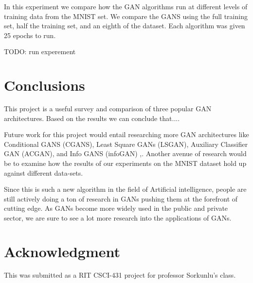 \documentclass[12pt,
 reprint,
 amsmath,amssymb,
 aps,
]{revtex4-2}
\begin{document}
In this experiment we compare how the GAN algorithms run at different levels of training data from the MNIST set. We compare the GANS using the full training set, half the training set, and an eighth of the dataset. Each algorithm was given 25 epochs to run. 

TODO: run experement






\section{\label{sec:exp}Conclusions}

This project is a useful survey and comparison of three popular GAN architectures. Based on the results we can conclude that....

Future work for this project would entail researching more GAN architectures like Conditional GANS (CGANS), Least Square GANs (LSGAN), Auxiliary Classifier GAN (ACGAN), and Info GANS (infoGAN) \cite{cGAN, lsgan, acgan, infogan},. Another avenue of research would be to examine how the results of our experiments on the MNIST dataset hold up against different data-sets. 

Since this is such a new algorithm in the field of Artificial intelligence, people are still actively doing a ton of research in GANs pushing them at the forefront of cutting edge. As GANs become more widely used in the public and private sector, we are sure to see a lot more research into the applications of GANs.

\section{Acknowledgment}

This was submitted as a RIT CSCI-431 project for professor Sorkunlu's class. 





\end{document}
